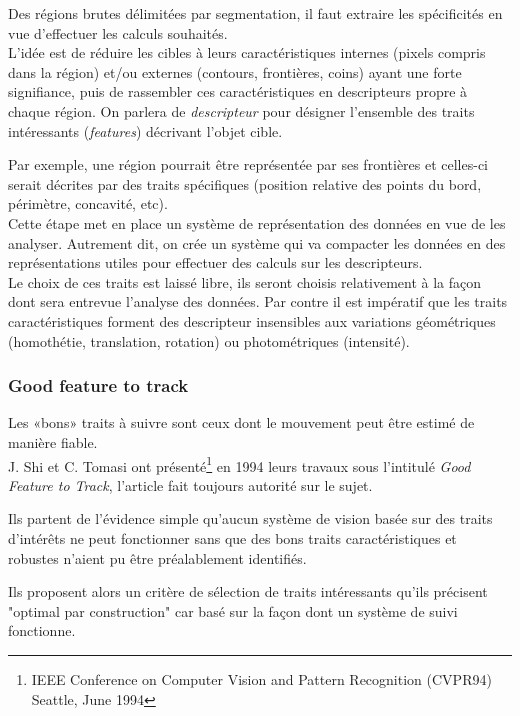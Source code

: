 \documentclass[a4paper,12pt]{report}
\begin{document}
Des régions brutes délimitées par segmentation, il faut extraire les spécificités en vue d'effectuer les calculs souhaités.\\

L'idée est de réduire les cibles à leurs caractéristiques internes (pixels compris dans la région) et/ou externes (contours, frontières, coins) ayant une forte signifiance, puis de rassembler ces caractéristiques en descripteurs propre à chaque région. On parlera de \textit{descripteur} pour désigner l'ensemble des traits intéressants (\textit{features}) décrivant l'objet cible. 

Par exemple, une région pourrait être représentée par ses frontières et celles-ci serait décrites par des traits spécifiques (position relative des points du bord, périmètre, concavité, etc).
\\

Cette étape met en place un système de représentation des données en vue de les analyser. Autrement dit, on crée un système qui va compacter les données en des représentations utiles pour effectuer des calculs sur les descripteurs.\\

Le choix de ces traits est laissé libre, ils seront choisis relativement à la façon dont sera entrevue l'analyse des données. Par contre il est impératif que les traits caractéristiques forment des descripteur insensibles aux variations géométriques (homothétie, translation, rotation) ou photométriques (intensité).   
\subsubsection{Good feature to track}
Les «bons» traits à suivre sont ceux dont le mouvement peut être estimé de manière fiable.\\

J. Shi et C. Tomasi ont présenté\footnote{IEEE Conference on Computer Vision and Pattern Recognition (CVPR94) Seattle, June 1994} en 1994 leurs travaux sous l'intitulé \textit{Good Feature to Track}, l'article fait toujours autorité sur le sujet. 

Ils partent de l'évidence simple qu'aucun système de vision basée sur des traits d'intérêts ne peut fonctionner sans que des bons traits caractéristiques et robustes n'aient pu être préalablement identifiés. 

Ils proposent alors un critère de sélection de traits intéressants qu'ils précisent "optimal par construction" car basé sur la façon dont un système de suivi fonctionne.\\
\end{document}
